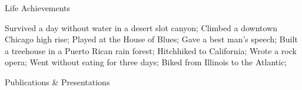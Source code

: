 \documentclass{resume} %
\begin{document}

\begin{rSection}{Life Achievements}
	
	Survived a day without water in a desert slot canyon;
	Climbed a downtown Chicago high rise;
	Played at the House of Blues;
	Gave a best man's speech;
	Built a treehouse in a Puerto Rican rain forest;
	Hitchhiked to California;
	Wrote a rock opera;
	Went without eating for three days;
	Biked from Illinois to the Atlantic;
			
\end{rSection}

\begin{rSection}{Publications \& Presentations}
	\nocite{*}
	
	
\end{rSection}
\end{document}
